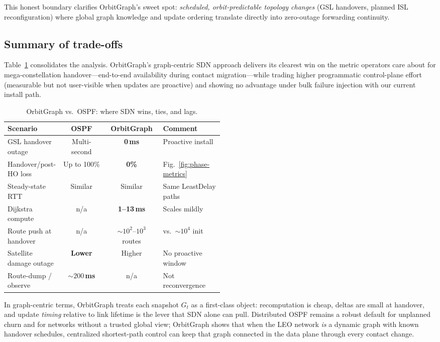 This honest boundary clarifies OrbitGraph's sweet spot: \emph{scheduled,
orbit-predictable topology changes} (GSL handovers, planned ISL reconfiguration)
where global graph knowledge and update ordering translate directly into
zero-outage forwarding continuity.

\subsection{Summary of trade-offs}

Table~\ref{tab:tradeoffs} consolidates the analysis.
OrbitGraph's graph-centric SDN approach delivers its clearest win on the metric
operators care about for mega-constellation handover---end-to-end availability
during contact migration---while trading higher programmatic control-plane effort
(measurable but not user-visible when updates are proactive) and showing no
advantage under bulk failure injection with our current install path.

\begin{table}[!t]
  \centering
  \caption{OrbitGraph vs.\ OSPF: where SDN wins, ties, and lags.}
  \label{tab:tradeoffs}
  \renewcommand{\arraystretch}{1.12}
  \begin{tabular}{@{}p{0.22\linewidth}ccp{0.28\linewidth}@{}}
    \hline
    Scenario & OSPF & OrbitGraph & Comment \\
    \hline
    GSL handover outage      & Multi-second & \textbf{0\,ms} & Proactive install \\
    Handover/post-HO loss    & Up to 100\% & \textbf{0\%} & Fig.~\ref{fig:phase-metrics} \\
    Steady-state RTT         & Similar & Similar & Same LeastDelay paths \\
    Dijkstra compute         & n/a & \textbf{1–13\,ms} & Scales mildly \\
    Route push at handover   & n/a & ${\sim}10^2$–$10^3$ routes & vs.\ ${\sim}10^4$ init \\
    Satellite damage outage  & \textbf{Lower} & Higher & No proactive window \\
    Route-dump / observe     & \textbf{${\sim}200$\,ms} & n/a & Not reconvergence \\
    \hline
  \end{tabular}
\end{table}

In graph-centric terms, OrbitGraph treats each snapshot $G_t$ as a first-class
object: recomputation is cheap, deltas are small at handover, and update
\emph{timing} relative to link lifetime is the lever that SDN alone can pull.
Distributed OSPF remains a robust default for unplanned churn and for networks
without a trusted global view; OrbitGraph shows that when the LEO network \emph{is}
a dynamic graph with known handover schedules, centralized shortest-path control
can keep that graph connected in the data plane through every contact change.
